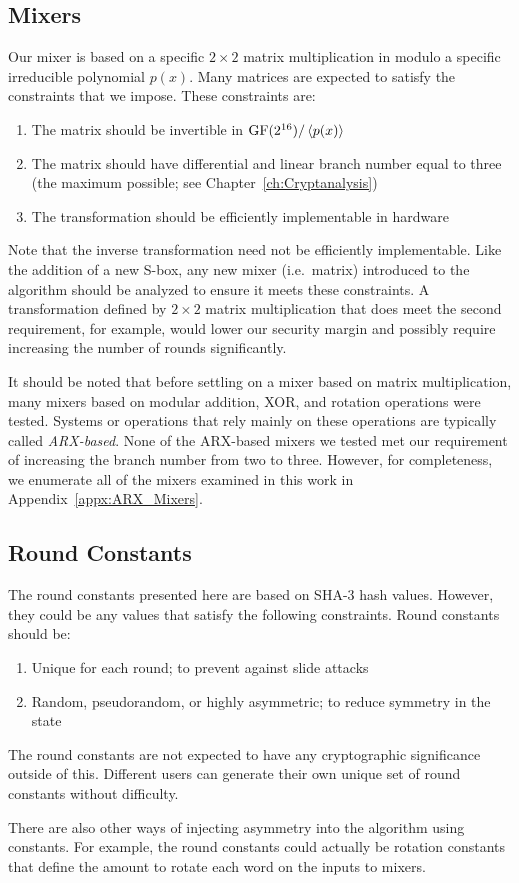 \subsection{Mixers}
Our mixer is based on a specific $2 \times 2$ matrix multiplication in \gfsixteen modulo a specific irreducible polynomial $p(x)$.
Many matrices are expected to satisfy the constraints that we impose.
These constraints are:
\begin{enumerate}
\item The matrix should be invertible in $\mathrm{GF}(2^{16}) /\left\langle p(x) \right\rangle$
\item The matrix should have differential and linear branch number equal to three (the maximum possible; see Chapter~\ref{ch:Cryptanalysis})
\item The transformation should be efficiently implementable in hardware
\end{enumerate}
Note that the inverse transformation need not be efficiently implementable.
Like the addition of a new S-box, any new mixer (i.e.\ matrix) introduced to the algorithm should be analyzed to ensure it meets these constraints.
A transformation defined by $2 \times 2$ matrix multiplication that does meet the second requirement, for example, would lower our security margin and possibly require increasing the number of rounds significantly.

It should be noted that before settling on a mixer based on matrix multiplication, many mixers based on modular addition, XOR, and rotation operations were tested.
Systems or operations that rely mainly on these operations are typically called \emph{ARX-based}.
None of the ARX-based mixers we tested met our requirement of increasing the branch number from two to three.
However, for completeness, we enumerate all of the mixers examined in this work in Appendix~\ref{appx:ARX_Mixers}.

\subsection{Round Constants}
The round constants presented here are based on SHA-3 hash values.
However, they could be any values that satisfy the following constraints.
Round constants should be:
\begin{enumerate}
\item Unique for each round; to prevent against slide attacks
\item Random, pseudorandom, or highly asymmetric; to reduce symmetry in the state
\end{enumerate}
The round constants are not expected to have any cryptographic significance outside of this.
Different users can generate their own unique set of round constants without difficulty.

There are also other ways of injecting asymmetry into the algorithm using constants.
For example, the round constants could actually be rotation constants that define the amount to rotate each word on the inputs to mixers.

